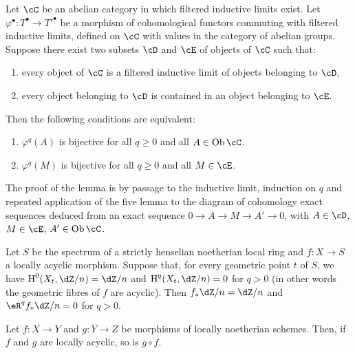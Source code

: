 \begin{lemma}\label{I:5-1-8}
Let $\cC$ be an abelian category in which filtered inductive limits
exist. Let $\varphi^\bullet:T^\bullet\to{T'}^\bullet$ be a
morphism of cohomological functors commuting with filtered inductive
limits, defined on $\cC$ with values in the category of abelian
groups. Suppose there exist two subsets $\cD$ and $\cE$ of objects
of $\cC$ such that:
\begin{enumerate}[\indent a)]
  \item every object of $\cC$ is a filtered inductive limit of objects belonging
    to $\cD$,
  \item every object belonging to $\cD$ is contained in an object belonging
    to $\cE$.
\end{enumerate}

Then the following conditions are equivalent:
\begin{enumerate}[\indent (i)]
  \item $\varphi^q(A)$ is bijective for all $q\geqslant 0$ and all
    $A\in\ob\cC$.
  \item $\varphi^q(M)$ is bijective for all $q\geqslant 0$ and all $M\in\cE$.
\end{enumerate}
\end{lemma}

The proof of the lemma is by passage to the inductive limit,
induction on $q$ and repeated application of the five lemma to the
diagram of cohomology exact sequences deduced from an exact sequence
$0\to A\to M\to A'\to 0$, with $A\in\cD$, $M\in\cE$, $A'\in \ob\cC$. 





\begin{corollary}\label{I:5-1-9}
Let $S$ be the spectrum of a strictly henselian noetherian local ring and
$f:X\to S$ a locally acyclic morphism. Suppose that, for every geometric
point $t$ of $S$, we have $\h^0(X_t,\dZ/n) = \dZ/n$ and
$\h^q(X_t,\dZ/n) = 0$ for $q>0$ (in other words the geometric fibres of
$f$ are acyclic). Then $f_* \dZ/n = \dZ/n$ and $\eR^qf_*\dZ/n = 0$ for
$q>0$.
\end{corollary}





\begin{corollary}\label{I:5-1-10}
Let $f:X\to Y$ and $g:Y\to Z$ be morphisms of locally
noetherian schemes. Then, if $f$ and $g$ are locally acyclic, so is
$g\circ f$.
\end{corollary}

